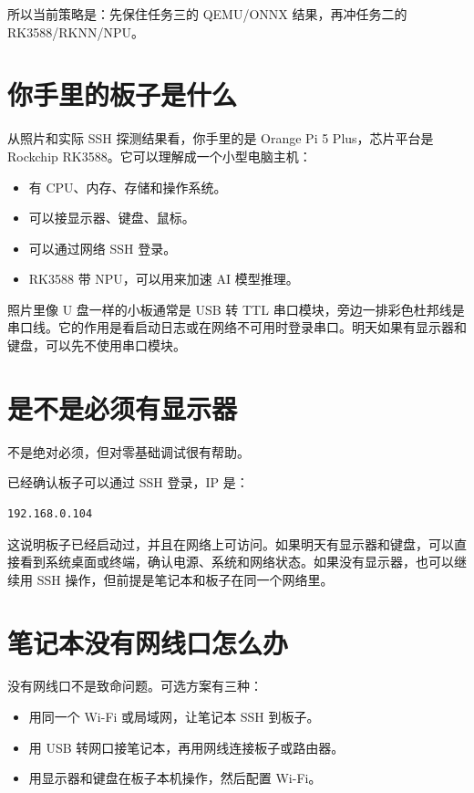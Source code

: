\documentclass[UTF8,a4paper,11pt]{ctexart}
\begin{document}
所以当前策略是：先保住任务三的 QEMU/ONNX 结果，再冲任务二的 RK3588/RKNN/NPU。

\section{你手里的板子是什么}

从照片和实际 SSH 探测结果看，你手里的是 Orange Pi 5 Plus，芯片平台是 Rockchip RK3588。它可以理解成一个小型电脑主机：

\begin{itemize}
  \item 有 CPU、内存、存储和操作系统。
  \item 可以接显示器、键盘、鼠标。
  \item 可以通过网络 SSH 登录。
  \item RK3588 带 NPU，可以用来加速 AI 模型推理。
\end{itemize}

照片里像 U 盘一样的小板通常是 USB 转 TTL 串口模块，旁边一排彩色杜邦线是串口线。它的作用是看启动日志或在网络不可用时登录串口。明天如果有显示器和键盘，可以先不使用串口模块。

\section{是不是必须有显示器}

不是绝对必须，但对零基础调试很有帮助。

已经确认板子可以通过 SSH 登录，IP 是：

\begin{verbatim}
192.168.0.104
\end{verbatim}

这说明板子已经启动过，并且在网络上可访问。如果明天有显示器和键盘，可以直接看到系统桌面或终端，确认电源、系统和网络状态。如果没有显示器，也可以继续用 SSH 操作，但前提是笔记本和板子在同一个网络里。

\section{笔记本没有网线口怎么办}

没有网线口不是致命问题。可选方案有三种：

\begin{itemize}
  \item 用同一个 Wi-Fi 或局域网，让笔记本 SSH 到板子。
  \item 用 USB 转网口接笔记本，再用网线连接板子或路由器。
  \item 用显示器和键盘在板子本机操作，然后配置 Wi-Fi。
\end{itemize}
\end{document}
